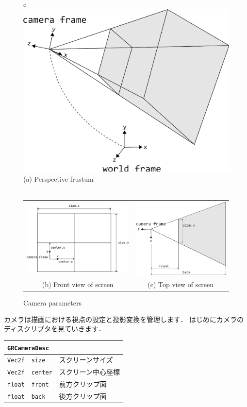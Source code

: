 \begin{figure}[t]
\begin{tabular}{c}
\includegraphics[width=.4\hsize]{fig/grcamera.eps} \\
(a) Perspective frustum \\
\\
\begin{tabular}{cc}
\includegraphics[width=.4\hsize]{fig/grcamera_front.eps} &
\includegraphics[width=.4\hsize]{fig/grcamera_top.eps} \\
(b) Front view of screen &
(c) Top view of screen
\end{tabular}
\end{tabular}
\caption{Camera parameters}
\label{fig_grcamera}
\end{figure}

\KLUDGE カメラは描画における視点の設定と投影変換を管理します．
\KLUDGE はじめにカメラのディスクリプタを見ていきます．

\begin{center}
\begin{tabular}{p{.15\hsize}p{.45\hsize}p{.3\hsize}}
\multicolumn{3}{l}{\texttt{GRCameraDesc}}					\\ \midrule
\texttt{Vec2f}	&	\texttt{size}	& \KLUDGE スクリーンサイズ 		\\
\texttt{Vec2f}	&	\texttt{center}	& \KLUDGE スクリーン中心座標 	\\
\texttt{float}	&	\texttt{front}	& \KLUDGE 前方クリップ面		\\
\texttt{float}	&	\texttt{back}	& \KLUDGE 後方クリップ面		\\
\end{tabular}
\end{center}

